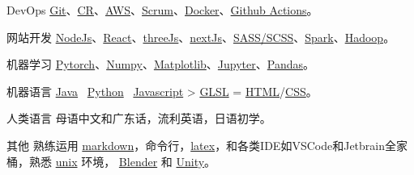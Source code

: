 
\begin{cvskills}

  \cvskill
    {DevOps} %
    {\href{https://git-scm.com/}{Git}、\href{https://en.wikipedia.org/wiki/Code_review}{CR}、\href{https://aws.amazon.com/}{AWS}、\href{https://www.scrum.org/resources/what-is-scrum}{Scrum}、\href{https://www.docker.com/}{Docker}、\href{https://github.com/features/actions}{Github Actions}。}

  \cvskill
    {网站开发} %
    {\href{https://nodejs.org/en/}{NodeJs}、\href{https://reactjs.org/}{React}、\href{https://threejs.org/}{threeJs}、\href{https://nextjs.org/}{nextJs}、\href{https://sass-lang.com/}{SASS/SCSS}、\href{https://spark.apache.org/}{Spark}、\href{https://hadoop.apache.org/}{Hadoop}。}

  \cvskill
    {机器学习} %
    {\href{https://pytorch.org/}{Pytorch}、\href{https://numpy.org/}{Numpy}、\href{https://matplotlib.org/}{Matplotlib}、\href{https://jupyter.org/}{Jupyter}、\href{https://pandas.pydata.org/}{Pandas}。}  %

  \cvskill
    {机器语言}
    {\href{https://www.java.com/en/}{Java} \approx\, \href{https://www.python.org/}{Python} \approx\, \href{https://www.javascript.com/}{Javascript} > \href{https://www.khronos.org/opengl/wiki/OpenGL_Shading_Language}{GLSL} = \href{https://developer.mozilla.org/en-US/docs/Glossary/HTML5}{HTML}/\href{https://developer.mozilla.org/en-US/docs/Web/CSS}{CSS}。}

  \cvskill
    {人类语言}
    {母语中文和广东话，流利英语，日语初学。}

  \cvskill
    {其他} %
    {熟练运用 \href{https://en.wikipedia.org/wiki/Markdown}{markdown}，命令行，\href{https://www.latex-project.org/}{latex}，和各类IDE如VSCode和Jetbrain全家桶，熟悉 \href{https://en.wikipedia.org/wiki/Unix}{unix} 环境， \href{https://www.blender.org/}{Blender} 和 \href{https://unity.com/}{Unity}。}

\end{cvskills}
